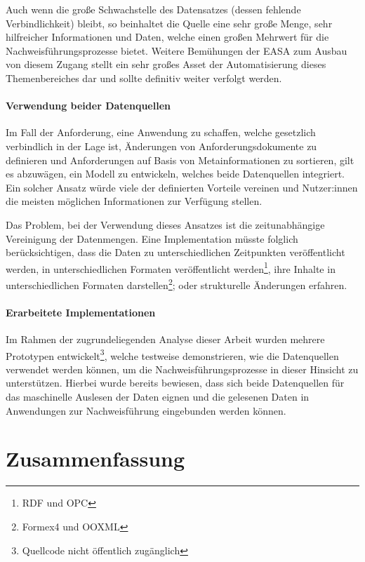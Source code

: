         \medskip
        Auch wenn die große Schwachstelle des Datensatzes (dessen fehlende Verbindlichkeit) bleibt, so beinhaltet die Quelle eine sehr große Menge, sehr hilfreicher Informationen und Daten, welche einen großen Mehrwert für die Nachweisführungsprozesse bietet.
        Weitere Bemühungen der \ac{EASA} zum Ausbau von diesem Zugang stellt ein sehr großes Asset der Automatisierung dieses Themenbereiches dar und sollte definitiv weiter verfolgt werden.       
        
    
    \subsubsection{Verwendung beider Datenquellen}

    Im Fall der Anforderung, eine Anwendung zu schaffen, welche gesetzlich verbindlich in der Lage ist, Änderungen von Anforderungsdokumente zu definieren und Anforderungen auf Basis von Metainformationen zu sortieren, gilt es abzuwägen, ein Modell zu entwickeln, welches beide Datenquellen integriert.
    Ein solcher Ansatz würde viele der definierten Vorteile vereinen und Nutzer:innen die meisten möglichen Informationen zur Verfügung stellen.
    
    \medskip
    Das Problem, bei der Verwendung dieses Ansatzes ist die zeitunabhängige Vereinigung der Datenmengen.
    Eine Implementation müsste folglich berücksichtigen, dass die Daten zu unterschiedlichen Zeitpunkten veröffentlicht werden, in unterschiedlichen Formaten veröffentlicht werden\footnote{\ac{RDF} und \ac{OPC}}, ihre Inhalte in unterschiedlichen Formaten darstellen\footnote{Formex4 und \ac{OOXML}}; oder strukturelle Änderungen erfahren.

    \pagebreak
    \subsubsection{Erarbeitete Implementationen}

Im Rahmen der zugrundeliegenden Analyse dieser Arbeit wurden mehrere Prototypen entwickelt\footnote{Quellcode nicht öffentlich zugänglich}, welche testweise demonstrieren, wie die Datenquellen verwendet werden können, um die Nachweisführungsprozesse in dieser Hinsicht zu unterstützen.
Hierbei wurde bereits bewiesen, dass sich beide Datenquellen für das maschinelle Auslesen der Daten eignen und die gelesenen Daten in Anwendungen zur Nachweisführung eingebunden werden können.

    
\chapter{Zusammenfassung}



